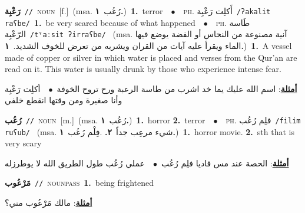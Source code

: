 \documentclass[10pt,a4paper,twoside]{article} %
\begin{document}
\begin{multicols}{2}
{\setlength\topsep{0pt}\textbf{\foreignlanguage{arabic}{رَعْبِة}}\ {\color{gray}\texttt{//}\color{black}}\ \textsc{noun}\ [f.]\ \color{gray}(msa. \foreignlanguage{arabic}{رُعُب}~\foreignlanguage{arabic}{\textbf{١.}})\color{black}\ \textbf{1.}~terror\ \ $\bullet$\ \ \textsc{ph.} \color{gray} \foreignlanguage{arabic}{أَكلِت رَعْبِة}\color{black}\ {\color{gray}\texttt{/{\sffamily ʔakalit raʕbe}/}\color{black}}\ \textbf{1.}~be very scared because of what happened\ \ $\bullet$\ \ \textsc{ph.} \color{gray} \foreignlanguage{arabic}{طَاسة الرّعْبِة}\color{black}\ {\color{gray}\texttt{/{\sffamily tˤaːsit ʔirraʕbe}/}\color{black}}\ \color{gray} (msa. \foreignlanguage{arabic}{آنية مصنوعة من النحاس أو الفضة يوضع فيها الماء ويقرأ عليه آيات من القران ويشربه من تعرض للخوف الشديد.}~\foreignlanguage{arabic}{\textbf{١.}})\color{black}\ \textbf{1.}~A vessel made of copper or silver in which water is placed and verses from the Qur’an are read on it. This water is usually drunk by those who experience intense fear.\  \begin{flushright}\color{gray}\foreignlanguage{arabic}{\textbf{\underline{\foreignlanguage{arabic}{أمثلة}}}: اسم الله عليك يما خد اشرب من طاسة الرعبة ورح تروح الخوفة\ $\bullet$\ \  أكلِت رَعْبِة وأنا صغيرة ومن وقتها انقطع خلفي}\end{flushright}\color{black}} \vspace{2mm}

{\setlength\topsep{0pt}\textbf{\foreignlanguage{arabic}{رُعُب}}\ {\color{gray}\texttt{//}\color{black}}\ \textsc{noun}\ [m.]\ \color{gray}(msa. \foreignlanguage{arabic}{رُعُب}~\foreignlanguage{arabic}{\textbf{١.}})\color{black}\ \textbf{1.}~horror  \textbf{2.}~terror\ \ $\bullet$\ \ \textsc{ph.} \color{gray} \foreignlanguage{arabic}{فلِم رُعُب}\color{black}\ {\color{gray}\texttt{/{\sffamily filim ruʕub}/}\color{black}}\ \color{gray} (msa. \foreignlanguage{arabic}{شيء مرعِب جداً}~\foreignlanguage{arabic}{\textbf{٢.}}  .\foreignlanguage{arabic}{فِلْم رُعُب}~\foreignlanguage{arabic}{\textbf{١.}})\color{black}\ \textbf{1.}~horror movie.  \textbf{2.}~sth that is very scary\  \begin{flushright}\color{gray}\foreignlanguage{arabic}{\textbf{\underline{\foreignlanguage{arabic}{أمثلة}}}: الحصة عند مس فاديا فلِم رُعُب\ $\bullet$\ \  عملي رُعُب طول الطريق الله لا يوطرزله}\end{flushright}\color{black}} \vspace{2mm}

{\setlength\topsep{0pt}\textbf{\foreignlanguage{arabic}{مَرْعُوب}}\ {\color{gray}\texttt{//}\color{black}}\ \textsc{noun\textunderscore pass}\ \textbf{1.}~being frightened\  \begin{flushright}\color{gray}\foreignlanguage{arabic}{\textbf{\underline{\foreignlanguage{arabic}{أمثلة}}}: مالك مَرْعُوب مني؟}\end{flushright}\color{black}} \vspace{2mm}


\end{multicols}
\end{document}
